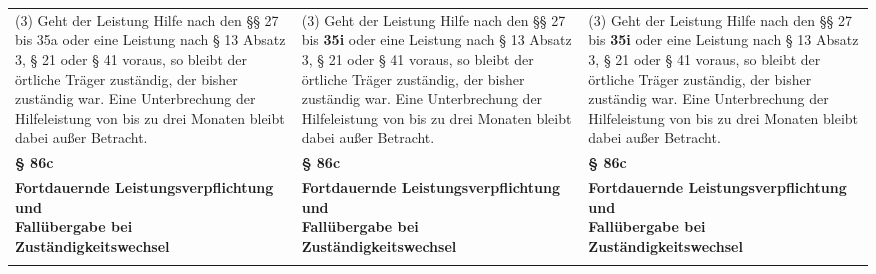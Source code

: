 \documentclass[10pt,a4paper,landscape]{article}
\begin{document}
\begin{longtable}{|L{8.2cm}|L{8.2cm}|L{8.2cm}|}
\hhline{|---|}
(3) Geht der Leistung Hilfe nach den \S{}\S{} 27  \newline bis \textcolor{diffred}{35a} oder eine Leistung nach \S{} 13  \newline Absatz 3, \S{} 21 oder \S{} 41 voraus, so bleibt  \newline der örtliche Träger zuständig, der bisher  \newline zuständig war. Eine Unterbrechung der  \newline Hilfeleistung von bis zu drei Monaten bleibt  \newline dabei außer Betracht. & (3) Geht der Leistung Hilfe nach den \S{}\S{} 27  \newline bis \textbf{35i }oder eine Leistung nach \S{} 13  \newline Absatz 3, \S{} 21 oder \S{} 41 voraus, so bleibt  \newline der örtliche Träger zuständig, der bisher  \newline zuständig war. Eine Unterbrechung der  \newline Hilfeleistung von bis zu drei Monaten bleibt  \newline dabei außer Betracht. & (3) Geht der Leistung Hilfe nach den \S{}\S{} 27  \newline bis \textbf{35i }oder eine Leistung nach \S{} 13  \newline Absatz 3, \S{} 21 oder \S{} 41 voraus, so bleibt  \newline der örtliche Träger zuständig, der bisher  \newline zuständig war. Eine Unterbrechung der  \newline Hilfeleistung von bis zu drei Monaten bleibt  \newline dabei außer Betracht. \\
\hhline{|---|}
\textbf{\S{} 86c} & \textbf{\S{} 86c} & \textbf{\S{} 86c} \\
\hhline{|---|}
\textbf{Fortdauernde Leistungsverpflichtung und  \newline Fallübergabe bei Zuständigkeitswechsel} & \textbf{Fortdauernde Leistungsverpflichtung und  \newline Fallübergabe bei Zuständigkeitswechsel} & \textbf{Fortdauernde Leistungsverpflichtung und  \newline Fallübergabe bei Zuständigkeitswechsel} \\
\hhline{|---|}

\end{longtable}
\end{document}
